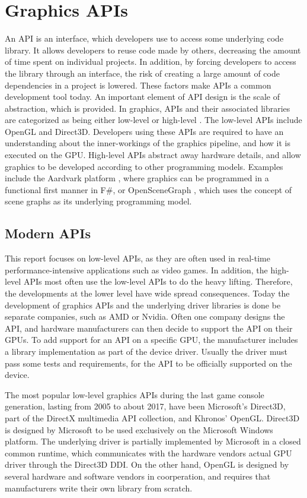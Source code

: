 \section{Graphics APIs}\label{sec:graphics_apis}
An \gls{API} is an interface, which developers use to access some underlying code library.
It allows developers to reuse code made by others, decreasing the amount of time spent on individual projects.
In addition, by forcing developers to access the library through an interface, the risk of creating a large amount of code dependencies in a project is lowered.
These factors make \glspl{API} a common development tool today.\cite{apiEvaluation}
An important element of \gls{API} design is the scale of abstraction, which is provided.
In graphics, \glspl{API} and their associated libraries are categorized as being either low-level or high-level \cite{wikiGraphicsLibs}.
The low-level \glspl{API} include OpenGL and Direct3D. Developers using these \glspl{API} are required to have an understanding about the inner-workings of the graphics pipeline, and how it is executed on the \gls{GPU}.
High-level \glspl{API} abstract away hardware details, and allow graphics to be developed according to other programming models.
Examples include the Aardvark platform \cite{aardvark}, where graphics can be programmed in a functional first manner in F\#, or OpenSceneGraph \cite{openSceneGraph}, which uses the concept of scene graphs as its underlying programming model. 

\subsection{Modern APIs}
This report focuses on low-level \glspl{API}, as they are often used in real-time performance-intensive applications such as video games.
In addition, the high-level \glspl{API} most often use the low-level \glspl{API} to do the heavy lifting.
Therefore, the developments at the lower level have wide spread consequences.
Today the development of graphics \glspl{API} and the underlying driver libraries is done be separate companies, such as AMD or Nvidia.
Often one company designs the \gls{API}, and hardware manufacturers can then decide to support the \gls{API} on their \glspl{GPU}.
To add support for an \gls{API} on a specific \gls{GPU}, the manufacturer includes a library implementation as part of the device driver.
Usually the driver must pass some tests and requirements, for the \gls{API} to be officially supported on the device.   

The most popular low-level graphics \glspl{API} during the last game console generation, lasting from 2005 to about 2017, have been Microsoft’s Direct3D, part of the DirectX multimedia API collection, and Khronos’ OpenGL. 
Direct3D is designed by Microsoft to be used exclusively on the Microsoft Windows platform. 
The underlying driver is partially implemented by Microsoft in a closed common runtime, which communicates with the hardware vendors actual \gls{GPU} driver through the Direct3D \gls{DDI}\cite{dxDDI}.
On the other hand, OpenGL is designed by several hardware and software vendors in coorperation, and requires that manufacturers write their own library from scratch. 

